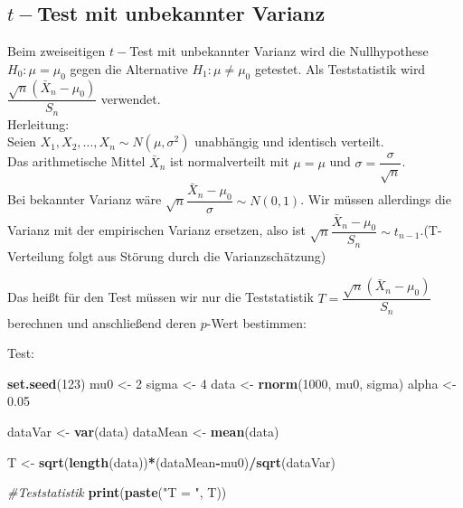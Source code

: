 \documentclass[]{article}
\newenvironment{Shaded}{\begin{snugshade}}{\end{snugshade}}
\newcommand{\CommentTok}[1]{\textcolor[rgb]{0.56,0.35,0.01}{\textit{#1}}}
\newcommand{\DecValTok}[1]{\textcolor[rgb]{0.00,0.00,0.81}{#1}}
\newcommand{\FloatTok}[1]{\textcolor[rgb]{0.00,0.00,0.81}{#1}}
\newcommand{\KeywordTok}[1]{\textcolor[rgb]{0.13,0.29,0.53}{\textbf{#1}}}
\newcommand{\NormalTok}[1]{#1}
\newcommand{\OperatorTok}[1]{\textcolor[rgb]{0.81,0.36,0.00}{\textbf{#1}}}
\newcommand{\StringTok}[1]{\textcolor[rgb]{0.31,0.60,0.02}{#1}}
\begin{document}
\hypertarget{t-test-mit-unbekannter-varianz}{%
\subsection{\texorpdfstring{\(t-\)Test mit unbekannter Varianz}{t-Test mit unbekannter Varianz}}\label{t-test-mit-unbekannter-varianz}}

Beim zweiseitigen \(t-\)Test mit unbekannter Varianz wird die Nullhypothese \(H_0: \mu = \mu_0\) gegen die Alternative \(H_1: \mu \neq \mu_0\) getestet.
Als Teststatistik wird \(\dfrac{\sqrt{n}(\bar X_n-\mu_0)}{S_n}\) verwendet.\\
Herleitung:\\
Seien \(X_1, X_2, \dots, X_n\sim N(\mu, \sigma^2)\) unabhängig und identisch verteilt.\\
Das arithmetische Mittel \(\bar X_n\) ist normalverteilt mit \(\mu = \mu\) und \(\sigma = \dfrac{\sigma}{\sqrt{n}}\).\\
Bei bekannter Varianz wäre \(\sqrt{n}\dfrac{\bar X_n-\mu_0}{\sigma}\sim N(0,1)\).
Wir müssen allerdings die Varianz mit der empirischen Varianz ersetzen, also ist \(\sqrt{n}\dfrac{\bar X_n-\mu_0}{S_n}\sim t_{n-1}\).(T-Verteilung folgt aus Störung durch die Varianzschätzung)

Das heißt für den Test müssen wir nur die Teststatistik \(T=\dfrac{\sqrt{n}(\bar X_n-\mu_0)}{S_n}\) berechnen und anschließend deren \(p\)-Wert bestimmen:

Test:

\begin{Shaded}
\begin{Highlighting}[]
\KeywordTok{set.seed}\NormalTok{(}\DecValTok{123}\NormalTok{)}
\NormalTok{mu0 <-}\StringTok{ }\DecValTok{2}
\NormalTok{sigma <-}\StringTok{ }\DecValTok{4}
\NormalTok{data <-}\StringTok{ }\KeywordTok{rnorm}\NormalTok{(}\DecValTok{1000}\NormalTok{, mu0, sigma)}
\NormalTok{alpha <-}\StringTok{ }\FloatTok{0.05}

\NormalTok{dataVar <-}\StringTok{ }\KeywordTok{var}\NormalTok{(data)}
\NormalTok{dataMean <-}\StringTok{ }\KeywordTok{mean}\NormalTok{(data)}

\NormalTok{T <-}\StringTok{ }\KeywordTok{sqrt}\NormalTok{(}\KeywordTok{length}\NormalTok{(data))}\OperatorTok{*}\NormalTok{(dataMean}\OperatorTok{-}\NormalTok{mu0)}\OperatorTok{/}\KeywordTok{sqrt}\NormalTok{(dataVar)}

\CommentTok{#Teststatistik}
\KeywordTok{print}\NormalTok{(}\KeywordTok{paste}\NormalTok{(}\StringTok{"T = "}\NormalTok{, T))}
\end{Highlighting}
\end{Shaded}
\end{document}
